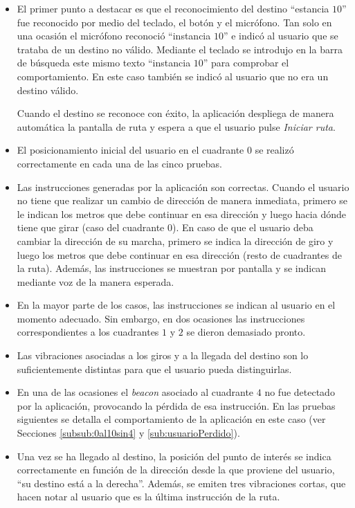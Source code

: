 \begin{itemize}
	
	\item El primer punto a destacar es que el reconocimiento del destino ``estancia $10$'' fue reconocido por medio del teclado, el botón y el micrófono. Tan solo en una ocasión el micrófono reconoció ``instancia $10$'' e indicó al usuario que se trataba de un destino no válido. Mediante el teclado se introdujo en la barra de búsqueda este mismo texto ``instancia $10$'' para comprobar el comportamiento. En este caso también se indicó al usuario que no era un destino válido. 
	
	Cuando el destino se reconoce con éxito, la aplicación despliega de manera automática la pantalla de ruta y espera a que el usuario pulse \textit{Iniciar ruta}. 
	
	\item El posicionamiento inicial del usuario en el cuadrante $0$ se realizó correctamente en cada una de las cinco pruebas.
	
	\item Las instrucciones generadas por la aplicación son correctas. Cuando el usuario no tiene que realizar un cambio de dirección de manera inmediata, primero se le indican los metros que debe continuar en esa dirección y luego hacia dónde tiene que girar (caso del cuadrante $0$). En caso de que el usuario deba cambiar la dirección de su marcha, primero se indica la dirección de giro y luego los metros que debe continuar en esa dirección (resto de cuadrantes de la ruta). Además, las instrucciones se muestran por pantalla y se indican mediante voz de la manera esperada.
	
	\item En la mayor parte de los casos, las instrucciones se indican al usuario en el momento adecuado. Sin embargo, en dos ocasiones las instrucciones correspondientes a los cuadrantes $1$ y $2$ se dieron demasiado pronto. 
	
	\item Las vibraciones asociadas a los giros y a la llegada del destino son lo suficientemente distintas para que el usuario pueda distinguirlas.
	
	\item En una de las ocasiones el \textit{beacon} asociado al cuadrante $4$ no fue detectado por la aplicación, provocando la pérdida de esa instrucción. En las pruebas siguientes se detalla el comportamiento de la aplicación en este caso (ver Secciones \ref{subsub:0al10sin4} y \ref{sub:usuarioPerdido}).
	
	\item Una vez se ha llegado al destino, la posición del punto de interés se indica correctamente en función de la dirección desde la que proviene del usuario, ``su destino está a la derecha''. Además, se emiten tres vibraciones cortas, que hacen notar al usuario que es la última instrucción de la ruta.
	
\end{itemize}

